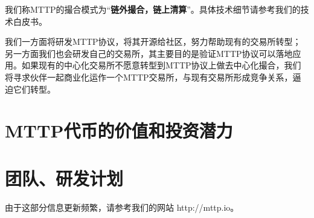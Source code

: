 \documentclass[UTF8,nofonts]{ctexart}
\begin{document}
我们称MTTP的撮合模式为“\textbf{链外撮合，链上清算}”。具体技术细节请参考我们的技术白皮书。

我们一方面将研发MTTP协议，将其开源给社区，努力帮助现有的交易所转型；另一方面我们也会研发自己的交易所，其主要目的是验证MTTP协议可以落地应用。如果现有的中心化交易所不愿意转型到MTTP协议上做去中心化撮合，我们将寻求伙伴一起商业化运作一个MTTP交易所，与现有交易所形成竞争关系，逼迫它们转型。


\section{MTTP代币的价值和投资潜力}


\section{团队、研发计划}

由于这部分信息更新频繁，请参考我们的网站 http://mttp.io。
\end{document}
